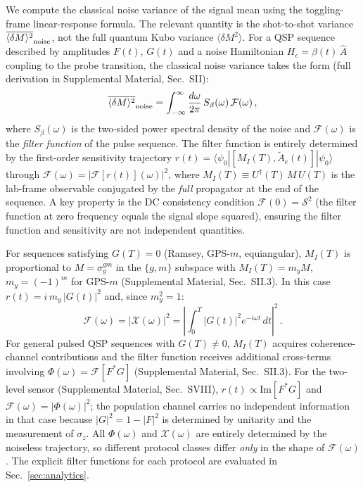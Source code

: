 \documentclass[aps,pra,twocolumn,superscriptaddress,longbibliography]{revtex4-2}
\newcommand{\be}{\begin{equation}}
\newcommand{\ee}{\end{equation}}
\begin{document}
We compute the classical noise variance of the signal mean using the
toggling-frame linear-response formula.
The relevant quantity is the shot-to-shot variance
$\overline{\langle\delta M\rangle^2}_{\rm noise}$,
not the full quantum Kubo variance $\langle\delta M^2\rangle$.
For a QSP sequence described by amplitudes $F(t)$, $G(t)$ and a noise
Hamiltonian $H_\epsilon = \beta(t)\,\hat{A}$ coupling to the probe transition,
the classical noise variance takes the form
(full derivation in Supplemental Material, Sec.~SII):
\be
  \overline{\langle \delta M \rangle^2}_{\rm noise}
  = \int_{-\infty}^{\infty}\frac{d\omega}{2\pi}\,
    S_\beta(\omega)\,\mathcal{F}(\omega)\,,
  \label{eq:kubo_general}
\ee
where $S_\beta(\omega)$ is the two-sided power spectral density of the noise
and $\mathcal{F}(\omega)$ is the \emph{filter function} of the pulse sequence.
The filter function is entirely determined by the first-order sensitivity trajectory
$r(t) = \langle\psi_0|[M_I(T), \tilde{A}_e(t)]|\psi_0\rangle$
through $\mathcal{F}(\omega) = |\mathcal{F}[r(t)](\omega)|^2$,
where $M_I(T) \equiv U^\dagger(T)\,M\,U(T)$ is the lab-frame observable conjugated
by the \emph{full} propagator at the end of the sequence.
A key property is the DC consistency condition
$\mathcal{F}(0) = \mathcal{S}^2$ (the filter function at zero frequency equals
the signal slope squared), ensuring the filter function and sensitivity
are not independent quantities.

For sequences satisfying $G(T)=0$ (Ramsey, GPS-$m$, equiangular), $M_I(T)$ is
proportional to $M = \sigma_y^{gm}$ in the $\{g,m\}$ subspace with
$M_I(T) = m_y M$, $m_y = (-1)^m$ for GPS-$m$
(Supplemental Material, Sec.~SII.3).
In this case $r(t) = i\,m_y\,|G(t)|^2$ and, since $m_y^2=1$:
\be
  \mathcal{F}(\omega) = |\mathcal{X}(\omega)|^2
    = \left|\int_0^T |G(t)|^2 e^{-i\omega t}\,dt\right|^2\,.
  \label{eq:Fe_general}
\ee
For general pulsed QSP sequences with $G(T)\neq 0$, $M_I(T)$ acquires
coherence-channel contributions and the filter function receives additional
cross-terms involving $\Phi(\omega) = \mathcal{F}[F^*G]$
(Supplemental Material, Sec.~SII.3).
For the two-level sensor (Supplemental Material, Sec.~SVIII), $r(t)\propto\mathrm{Im}[F^*G]$
and $\mathcal{F}(\omega) = |\Phi(\omega)|^2$; the population channel carries no
independent information in that case because $|G|^2 = 1-|F|^2$ is determined by
unitarity and the measurement of $\sigma_z$.
All $\Phi(\omega)$ and $\mathcal{X}(\omega)$ are entirely determined by the
noiseless trajectory, so different protocol classes differ \emph{only} in the
shape of $\mathcal{F}(\omega)$.
The explicit filter functions for each protocol are evaluated in
Sec.~\ref{sec:analytics}.
\end{document}
